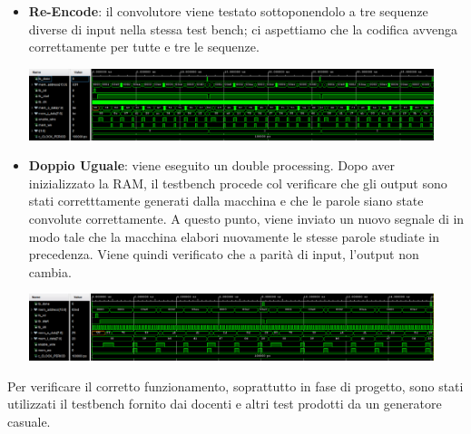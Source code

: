 \begin{itemize}
\begin{center}
    \end{center}
    \item \textbf{Re-Encode}:  il convolutore viene testato sottoponendolo a tre sequenze diverse di input nella stessa test bench; ci aspettiamo che la codifica avvenga correttamente per tutte e tre le sequenze.
    \begin{center}
    \includegraphics[width=0.93\textwidth]{images/simulations/REEncode.png}
    \end{center}
    \item \textbf{Doppio Uguale}: viene eseguito un double processing. Dopo aver inizializzato la RAM, il testbench procede col verificare che gli output sono stati corretttamente generati dalla macchina e che le parole siano state convolute correttamente. A questo punto, viene inviato un nuovo segnale di  in modo tale che la macchina elabori nuovamente le stesse parole studiate in precedenza. Viene quindi verificato che a parità di input, l’output non cambia.
    \begin{center}
    \includegraphics[width=0.93\textwidth]{images/simulations/DoppioUguale.png}
    \end{center}
\end{itemize}
Per verificare il corretto funzionamento, soprattutto in fase di progetto, sono stati utilizzati il testbench fornito dai docenti e altri test prodotti da un generatore casuale.
